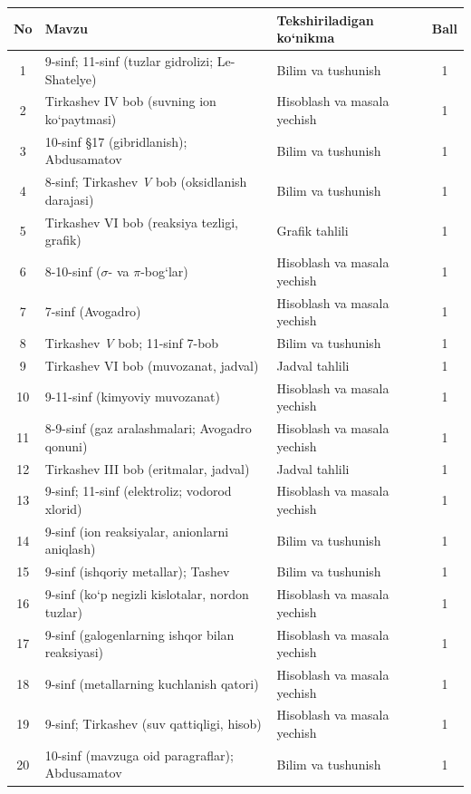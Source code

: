 \documentclass[11pt,a4paper]{article}
\begin{document}
{\small\noindent\begin{longtable}{|c|p{7.2cm}|p{5.4cm}|c|}\hline \textbf{No} & \textbf{Mavzu} & \textbf{Tekshiriladigan ko`nikma} & \textbf{Ball}\\\hline
1 & 9-sinf; 11-sinf (tuzlar gidrolizi; Le-Shatelye) & Bilim va tushunish & 1\\\hline
2 & Tirkashev IV bob (suvning ion ko`paytmasi) & Hisoblash va masala yechish & 1\\\hline
3 & 10-sinf \S{}17 (gibridlanish); Abdusamatov & Bilim va tushunish & 1\\\hline
4 & 8-sinf; Tirkashev \textit{V} bob (oksidlanish darajasi) & Bilim va tushunish & 1\\\hline
5 & Tirkashev VI bob (reaksiya tezligi, grafik) & Grafik tahlili & 1\\\hline
6 & 8-10-sinf ($\sigma$- va $\pi$-bog`lar) & Hisoblash va masala yechish & 1\\\hline
7 & 7-sinf (Avogadro) & Hisoblash va masala yechish & 1\\\hline
8 & Tirkashev \textit{V} bob; 11-sinf 7-bob & Bilim va tushunish & 1\\\hline
9 & Tirkashev VI bob (muvozanat, jadval) & Jadval tahlili & 1\\\hline
10 & 9-11-sinf (kimyoviy muvozanat) & Hisoblash va masala yechish & 1\\\hline
11 & 8-9-sinf (gaz aralashmalari; Avogadro qonuni) & Hisoblash va masala yechish & 1\\\hline
12 & Tirkashev III bob (eritmalar, jadval) & Jadval tahlili & 1\\\hline
13 & 9-sinf; 11-sinf (elektroliz; vodorod xlorid) & Hisoblash va masala yechish & 1\\\hline
14 & 9-sinf (ion reaksiyalar, anionlarni aniqlash) & Bilim va tushunish & 1\\\hline
15 & 9-sinf (ishqoriy metallar); Tashev & Bilim va tushunish & 1\\\hline
16 & 9-sinf (ko`p negizli kislotalar, nordon tuzlar) & Hisoblash va masala yechish & 1\\\hline
17 & 9-sinf (galogenlarning ishqor bilan reaksiyasi) & Hisoblash va masala yechish & 1\\\hline
18 & 9-sinf (metallarning kuchlanish qatori) & Hisoblash va masala yechish & 1\\\hline
19 & 9-sinf; Tirkashev (suv qattiqligi, hisob) & Hisoblash va masala yechish & 1\\\hline
20 & 10-sinf (mavzuga oid paragraflar); Abdusamatov & Bilim va tushunish & 1\\\hline

\end{longtable}}
\end{document}
